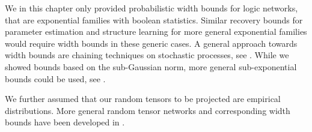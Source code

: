 
We in this chapter only provided probabilistic width bounds for logic networks, that are exponential families with boolean statistics.
Similar recovery bounds for parameter estimation and structure learning for more general exponential families would require width bounds in these generic cases.
A general approach towards width bounds are chaining techniques on stochastic processes, see \cite{talagrand_upper_2014}.
While we showed bounds based on the sub-Gaussian norm, more general sub-exponential bounds could be used, see \cite{wainwright_high-dimensional_2019}.

We further assumed that our random tensors to be projected are empirical distributions.
More general random tensor networks and corresponding width bounds have been developed in \cite{goesmann_uniform_2021}.
